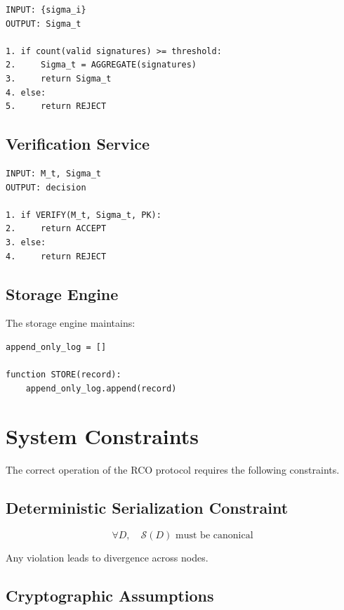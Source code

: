 \begin{verbatim}
INPUT: {sigma_i}
OUTPUT: Sigma_t

1. if count(valid signatures) >= threshold:
2.     Sigma_t = AGGREGATE(signatures)
3.     return Sigma_t
4. else:
5.     return REJECT
\end{verbatim}

\subsection{Verification Service}

\begin{verbatim}
INPUT: M_t, Sigma_t
OUTPUT: decision

1. if VERIFY(M_t, Sigma_t, PK):
2.     return ACCEPT
3. else:
4.     return REJECT
\end{verbatim}

\subsection{Storage Engine}

The storage engine maintains:

\begin{verbatim}
append_only_log = []

function STORE(record):
    append_only_log.append(record)
\end{verbatim}

\section{System Constraints}

The correct operation of the RCO protocol requires the following constraints.

\subsection{Deterministic Serialization Constraint}

\begin{equation}
\forall D, \quad \mathcal{S}(D) \text{ must be canonical}
\end{equation}

Any violation leads to divergence across nodes.

\subsection{Cryptographic Assumptions}

